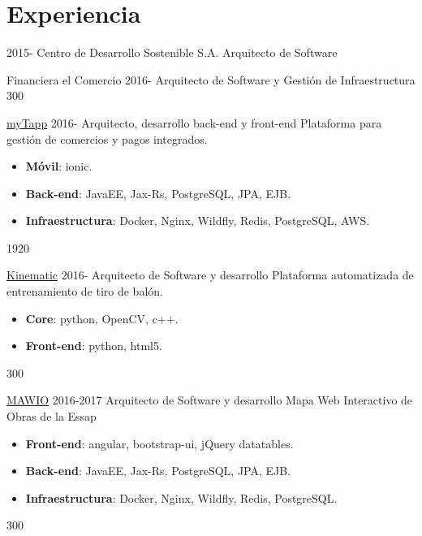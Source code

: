 \documentclass[]{friggeri-cv}
\begin{document}
\section{Experiencia}
\begin{entrylist}
\entry
    {2015-}
    {Centro de Desarrollo Sostenible S.A.}
    {Arquitecto de Software}
    {\proyecto
        {Financiera el Comercio}
        {2016-}
        {Arquitecto de Software y Gestión de Infraestructura}
        {}
        {} 
        {300}
    
    \proyecto
        {\href{https://www.mytappweb.com}{myTapp}}
        {2016-}
        {Arquitecto, desarrollo back-end y front-end}
        {Plataforma para gestión de comercios y pagos integrados.}
        {\begin{itemize}
            \item \textbf{Móvil}: ionic.
            \item \textbf{Back-end}: JavaEE, Jax-Rs, PostgreSQL, JPA, EJB.
            \item \textbf{Infraestructura}: Docker, Nginx, Wildfly, Redis, PostgreSQL, AWS.
        \end{itemize}} 
        {1920}
        
    \proyecto
        {\href{http://www.cds.com.py/productos/kinematics/}{Kinematic}}
        {2016-}
        {Arquitecto de Software y desarrollo}
        {Plataforma automatizada de entrenamiento de tiro de balón.}
        {\begin{itemize}
            \item \textbf{Core}: python, OpenCV, c++.
            \item \textbf{Front-end}: python, html5.
        \end{itemize}}
        {300}
        
    \proyecto
        {\href{https://mawio.net/}{MAWIO}}
        {2016-2017}
        {Arquitecto de Software y desarrollo}
        {Mapa Web Interactivo de Obras de la Essap}
        {\begin{itemize}
            \item \textbf{Front-end}: angular, bootstrap-ui, jQuery datatables.
            \item \textbf{Back-end}: JavaEE, Jax-Rs, PostgreSQL, JPA, EJB.
            \item \textbf{Infraestructura}: Docker, Nginx, Wildfly, Redis, PostgreSQL.
        \end{itemize}}
        {300}
        
}
\end{entrylist}
\end{document}
